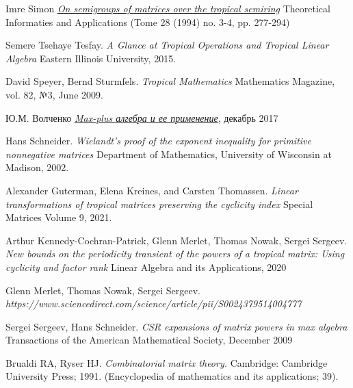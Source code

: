 \documentclass[12pt]{article}
\begin{document}
\begin{thebibliography}{9}
Imre Simon
\textit{\href{http://www.numdam.org/item?id=ITA_1994__28_3-4_277_0}{On semigroups of matrices over the tropical semiring}}
Theoretical Informaties and Applications (Tome 28 (1994) no. 3-4, pp. 277-294)

Semere Tsehaye Tesfay.
\textit{A Glance at Tropical Operations and Tropical Linear Algebra}
Eastern Illinois University, 2015.

David Speyer, Bernd Sturmfels.
\textit{Tropical Mathematics}
Mathematics Magazine, vol. 82, №3, June 2009.

Ю.М. Волченко
\textit{\href{http://yura.volchenko.com/Science/Max-plus.pdf}{Max-plus алгебра и ее применение}}, декабрь 2017

Hans Schneider.
\textit{Wielandt’s proof of the exponent inequality for
primitive nonnegative matrices}
Department of Mathematics, University of Wisconsin at Madison, 2002.

Alexander Guterman, Elena Kreines, and Carsten Thomassen.
\textit{Linear transformations of tropical matrices
preserving the cyclicity index}
Special Matrices Volume 9, 2021.

Arthur Kennedy-Cochran-Patrick, Glenn Merlet, Thomas Nowak, Sergei Sergeev.
\textit{New bounds on the periodicity transient of the powers of a tropical matrix: Using cyclicity and factor rank}
Linear Algebra and its Applications, 2020

Glenn Merlet, Thomas Nowak, Sergei Sergeev.
\\\textit{https://www.sciencedirect.com/science/article/pii/S0024379514004777}

Sergei Sergeev, Hans Schneider.
\textit{CSR expansions of matrix powers in max algebra} Transactions of the American Mathematical Society, December 2009

Brualdi RA, Ryser HJ. \textit{Combinatorial matrix theory.} Cambridge: Cambridge University Press;
1991. (Encyclopedia of mathematics and its applications; 39).

\end{thebibliography}
\end{document}
